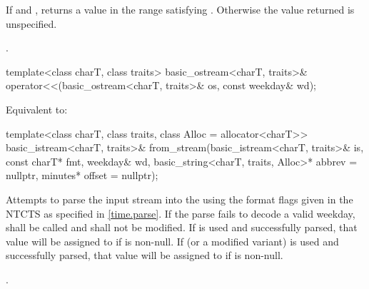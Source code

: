 \begin{itemdescr}
\pnum
\returns
If 
and ,
returns a value 
in the range 
satisfying .
Otherwise the value returned is unspecified.
\begin{example}
.
\end{example}
\end{itemdescr}

%
\begin{itemdecl}
template<class charT, class traits>
  basic_ostream<charT, traits>&
    operator<<(basic_ostream<charT, traits>& os, const weekday& wd);
\end{itemdecl}

\begin{itemdescr}
\pnum
\effects
Equivalent to:
\end{itemdescr}

%
\begin{itemdecl}
template<class charT, class traits, class Alloc = allocator<charT>>
  basic_istream<charT, traits>&
    from_stream(basic_istream<charT, traits>& is, const charT* fmt,
                weekday& wd, basic_string<charT, traits, Alloc>* abbrev = nullptr,
                minutes* offset = nullptr);
\end{itemdecl}

\begin{itemdescr}
\pnum
\effects
Attempts to parse the input stream 
into the   using
the format flags given in the NTCTS 
as specified in \ref{time.parse}.
If the parse fails to decode a valid weekday,
 shall be called
and  shall not be modified.
If  is used and successfully parsed,
that value will be assigned to  if  is non-null.
If  (or a modified variant) is used and successfully parsed,
that value will be assigned to  if  is non-null.

\pnum
\returns
{}.
\end{itemdescr}


